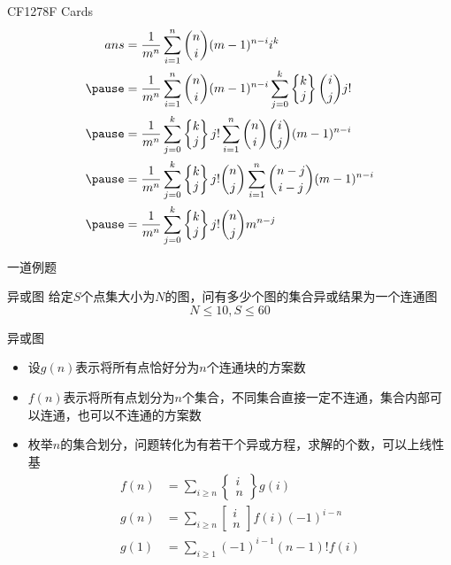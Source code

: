 \documentclass{beamer}
\begin{document}
\begin{frame}{CF1278F Cards}
    $$\begin{aligned}
        ans &= \frac{1}{m^n}\sum_{i = 1}^n{n\choose i}(m - 1)^{n - i}i^k\\ \pause
        &= \frac{1}{m^n}\sum_{i = 1}^n{n\choose i}(m - 1)^{n - i}\sum_{j = 0}^k\begin{Bmatrix}k\\ j\end{Bmatrix}{i\choose j}j!\\ \pause
        &= \frac{1}{m^n}\sum_{j = 0}^k\begin{Bmatrix}k\\ j\end{Bmatrix}j!\sum_{i = 1}^n{n\choose i}{i\choose j}(m - 1)^{n - i}\\ \pause
        &= \frac{1}{m^n}\sum_{j = 0}^k\begin{Bmatrix}k\\ j\end{Bmatrix}j!{n\choose j}\sum_{i = 1}^n{n - j\choose i - j}(m - 1)^{n - i}\\ \pause
        &= \frac{1}{m^n}\sum_{j = 0}^k\begin{Bmatrix}k\\ j\end{Bmatrix}j!{n\choose j}m^{n - j}
    \end{aligned}$$
\end{frame}

\begin{frame}{一道例题}
    \begin{block}{异或图}
        给定$S$个点集大小为$N$的图，问有多少个图的集合异或结果为一个连通图
        $$N\leq 10, S\leq 60$$
    \end{block}
\end{frame}

\begin{frame}{异或图}
    \begin{itemize}
        \item 设$g(n)$表示将所有点恰好分为$n$个连通块的方案数 \pause
        \item $f(n)$表示将所有点划分为$n$个集合，不同集合直接一定不连通，集合内部可以连通，也可以不连通的方案数 \pause
        \item 枚举$n$的集合划分，问题转化为有若干个异或方程，求解的个数，可以上线性基 \pause
        $$\begin{aligned}
            f(n) &= \sum_{i\geq n} \begin{Bmatrix}i\\ n\end{Bmatrix}g(i)\\
            g(n) &= \sum_{i\geq n} \begin{bmatrix}i\\ n\end{bmatrix}f(i)(-1)^{i - n}\\
            g(1) &= \sum_{i\geq 1} (-1)^{i - 1}(n - 1)!f(i)
        \end{aligned}$$
    \end{itemize}
\end{frame}
\end{document}
